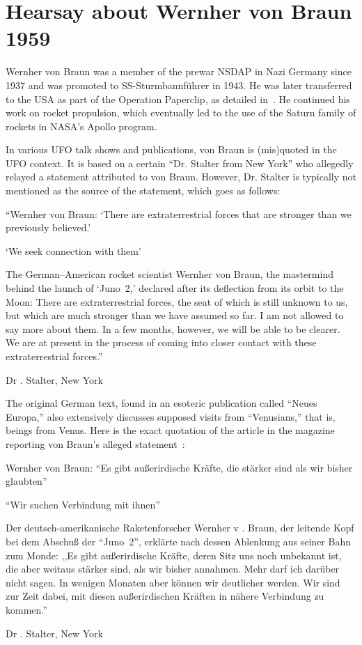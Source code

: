 \section{Hearsay about Wernher von Braun 1959}

\label{2023-UFO-chapter-History--1953-2016-hswvb59}


Wernher von Braun was a member of the prewar NSDAP in Nazi Germany since 1937 and was promoted to SS-Sturmbannf\"uhrer in 1943. He was later transferred to the USA as part of the Operation Paperclip, as detailed in~\cite{Jacobsen2014}. He continued his work on rocket propulsion, which eventually led to the use of the Saturn family of rockets in NASA's Apollo program.

In various UFO talk shows and publications, von Braun is (mis)quoted in the UFO context.
It is based on a certain ``Dr. Stalter from New York'' who
allegedly relayed a statement attributed to von Braun.
However, Dr. Stalter is typically not mentioned as the source of the statement, which goes as follows:
\begin{svgraybox}
``Wernher von Braun:
`There are extraterrestrial forces that are stronger than we previously believed.'

`We seek connection with them'

The German--American rocket scientist Wernher von Braun, the mastermind behind the launch of `Juno~2,' declared after its deflection from its orbit to the Moon:
There are extraterrestrial forces, the seat of which is still unknown to us, but which are much stronger than we have assumed so far.
I am not allowed to say more about them.
In a few months, however, we will be able to be clearer. We are at present in the process of coming into closer contact with these extraterrestrial forces.''

Dr . Stalter, New York
\end{svgraybox}

The original German text, found in an esoteric publication called ``Neues Europa,'' also extensively discusses supposed visits from ``Venusians,'' that is, beings from Venus.
Here is the exact quotation of the article in the magazine reporting von Braun's alleged statement~\cite{vonBraun1959}:
\begin{svgraybox}
Wernher von Braun:
``Es gibt au{\ss}erirdische Kr\"afte, die st\"arker sind als wir bisher glaubten''

``Wir suchen Verbindung mit ihnen''

Der deutsch-amerikanische Raketenforscher Wernher v . Braun, der leitende Kopf bei dem Abschu{\ss} der ``Juno~2'', erkl\"arte nach dessen Ablenkung aus seiner Bahn zum Monde:
,,Es gibt au{\ss}erirdische Kr\"afte, deren Sitz uns noch unbekannt ist, die aber weitaus st\"arker sind, als wir bisher annahmen.
Mehr darf ich dar\"uber nicht sagen.
In wenigen Monaten aber k\"onnen wir deutlicher werden. Wir sind zur Zeit dabei, mit diesen au{\ss}erirdischen Kr\"aften in n\"ahere Verbindung zu kommen.''

Dr . Stalter, New York
\end{svgraybox}


